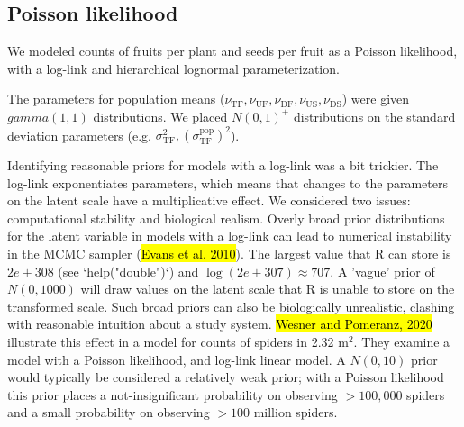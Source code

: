 \documentclass[12pt, oneside, titlepage]{article}   	%
\begin{document}





\subsection*{Poisson likelihood}

We modeled counts of fruits per plant and seeds per fruit as a Poisson likelihood, with a log-link and hierarchical lognormal parameterization. 

The parameters for population means ($\nu_\mathrm{TF},\nu_\mathrm{UF},\nu_\mathrm{DF},\nu_\mathrm{US},\nu_\mathrm{DS}$) were given $gamma(1,1)$ distributions. We placed $N(0,1)^+$ distributions on the standard deviation parameters (e.g. $\sigma^2_\mathrm{TF}, (\sigma^\mathrm{pop}_\mathrm{TF})^2$).

Identifying reasonable priors for models with a log-link was a bit trickier. The log-link exponentiates parameters, which means that changes to the parameters on the latent scale have a multiplicative effect. We considered two issues: computational stability and biological realism. Overly broad prior distributions for the latent variable in models with a log-link can lead to numerical instability in the MCMC sampler (\hl{Evans et al. 2010}). The largest value that R can store is $2e+308$ (see `help("double")`) and $\log(2e+307) \approx 707$. A 'vague' prior of $N(0,1000)$ will draw values on the latent scale that R is unable to store on the transformed scale. Such broad priors can also be biologically unrealistic, clashing with reasonable intuition about a study system. \hl{Wesner and Pomeranz, 2020} illustrate this effect in a model for counts of spiders in 2.32 $\mathrm{m}^2$. They examine a model with a Poisson likelihood, and log-link linear model. A $N(0,10)$ prior would typically be considered a relatively weak prior; with a Poisson likelihood this prior places a not-insignificant probability on observing $>100,000$ spiders and a small probability on observing $>100$ million spiders. 
\end{document}
